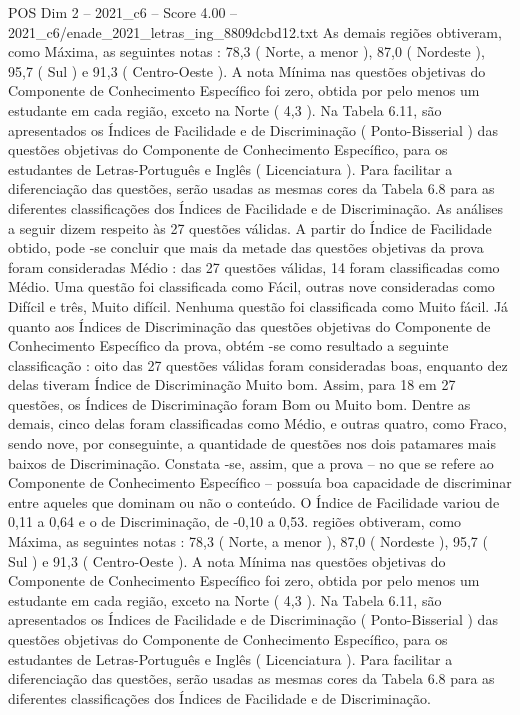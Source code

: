 \begin{textsample}{POS Dim 2 – 2021\_c6 – Score 4.00 – 2021\_c6/enade\_2021\_letras\_ing\_8809dcbd12.txt}
As demais regiões obtiveram, como Máxima, as seguintes notas : 78,3 ( Norte, a menor ), 87,0 ( Nordeste ), 95,7 ( Sul ) e 91,3 ( Centro-Oeste ).
A nota Mínima nas questões objetivas do Componente de Conhecimento Específico foi zero, obtida por pelo menos um estudante em cada região, exceto na Norte ( 4,3 ).
Na Tabela 6.11, são apresentados os Índices de Facilidade e de Discriminação ( Ponto-Bisserial ) das questões objetivas do Componente de Conhecimento Específico, para os estudantes de Letras-Português e Inglês ( Licenciatura ).
Para facilitar a diferenciação das questões, serão usadas as mesmas cores da Tabela 6.8 para as diferentes classificações dos Índices de Facilidade e de Discriminação.
As análises a seguir dizem respeito às 27 questões válidas.
A partir do Índice de Facilidade obtido, pode -se concluir que mais da metade das questões objetivas da prova foram consideradas Médio : das 27 questões válidas, 14 foram classificadas como Médio.
Uma questão foi classificada como Fácil, outras nove consideradas como Difícil e três, Muito difícil.
Nenhuma questão foi classificada como Muito fácil.
Já quanto aos Índices de Discriminação das questões objetivas do Componente de Conhecimento Específico da prova, obtém -se como resultado a seguinte classificação : oito das 27 questões válidas foram consideradas boas, enquanto dez delas tiveram Índice de Discriminação Muito bom.
Assim, para 18 em 27 questões, os Índices de Discriminação foram Bom ou Muito bom.
Dentre as demais, cinco delas foram classificadas como Médio, e outras quatro, como Fraco, sendo nove, por conseguinte, a quantidade de questões nos dois patamares mais baixos de Discriminação.
Constata -se, assim, que a prova – no que se refere ao Componente de Conhecimento Específico – possuía boa capacidade de discriminar entre aqueles que dominam ou não o conteúdo.
O Índice de Facilidade variou de 0,11 a 0,64 e o de Discriminação, de -0,10 a 0,53. regiões obtiveram, como Máxima, as seguintes notas : 78,3 ( Norte, a menor ), 87,0 ( Nordeste ), 95,7 ( Sul ) e 91,3 ( Centro-Oeste ).
A nota Mínima nas questões objetivas do Componente de Conhecimento Específico foi zero, obtida por pelo menos um estudante em cada região, exceto na Norte ( 4,3 ).
Na Tabela 6.11, são apresentados os Índices de Facilidade e de Discriminação ( Ponto-Bisserial ) das questões objetivas do Componente de Conhecimento Específico, para os estudantes de Letras-Português e Inglês ( Licenciatura ).
Para facilitar a diferenciação das questões, serão usadas as mesmas cores da Tabela 6.8 para as diferentes classificações dos Índices de Facilidade e de Discriminação.

\end{textsample}
